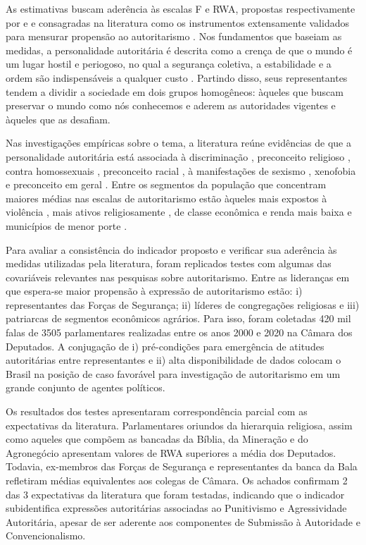 \documentclass[
12pt,				%
openright,			%
twoside,			%
a4paper,			%
english,			%
french,				%
spanish,			%
brazil				%
]{abntex2}
\begin{document}
As estimativas buscam aderência às escalas F e RWA, propostas respectivamente por  e  e consagradas na literatura como os instrumentos extensamente validados para mensurar propensão ao autoritarismo \cite{titus1957california, meloen1993f}. Nos fundamentos que baseiam as medidas, a personalidade autoritária é descrita como a crença de que o mundo é um lugar hostil e periogoso, no qual a segurança coletiva, a estabilidade e a ordem são indispensáveis a qualquer custo \cite{altemeyer1996authoritarian}. Partindo disso, seus representantes tendem a dividir a sociedade em dois grupos homogêneos: àqueles que buscam preservar o mundo como nós conhecemos e aderem as autoridades vigentes e àqueles que as desafiam.

Nas investigações empíricas sobre o tema, a literatura reúne evidências de que a personalidade autoritária está associada à discriminação \cite{titus1957california, meloen1993f}, preconceito religioso \cite{laythe2001predicting}, contra homossexuais \cite{hunsberger1996religious, jonathan2008influence}, preconceito racial \cite{rowatt2004christian}, à manifestações de sexismo \cite{sibley2007antecedents}, xenofobia \cite{thomsen2008we} e preconceito em geral \cite{asbrock2010right}. Entre os segmentos da população que concentram maiores médias nas escalas de autoritarismo estão àqueles mais expostos à violência \cite{seligson2010crime, carreras2013impact, de2018analises}, mais ativos religiosamente \cite{rokeach1956political,johnson2011mediational, fuks2012atitudes}, de classe econômica e renda mais baixa e municípios de menor porte \cite{fbsp2017medo}.      

Para avaliar a consistência do indicador proposto e verificar sua aderência às medidas utilizadas pela literatura, foram replicados testes com algumas das covariáveis relevantes nas pesquisas sobre autoritarismo. Entre as lideranças em que espera-se maior propensão à expressão de autoritarismo estão: i) representantes das Forças de Segurança; ii) líderes de congregações religiosas e iii) patriarcas de segmentos econômicos agrários. Para isso, foram coletadas 420 mil falas de 3505 parlamentares realizadas entre os anos 2000 e 2020 na Câmara dos Deputados. A conjugação de i) pré-condições para emergência de atitudes autoritárias entre representantes e ii) alta disponibilidade de dados colocam o Brasil na posição de caso favorável para investigação de autoritarismo em um grande conjunto de agentes políticos. 

Os resultados dos testes apresentaram correspondência parcial com as expectativas da literatura. Parlamentares oriundos da hierarquia religiosa, assim como aqueles que compõem as bancadas da Bíblia, da Mineração e do Agronegócio apresentam valores de RWA superiores a média dos Deputados. Todavia, ex-membros das Forças de Segurança e representantes da banca da Bala refletiram médias equivalentes aos colegas de Câmara. Os achados confirmam 2 das 3 expectativas da literatura que foram testadas, indicando que o indicador subidentifica expressões autoritárias associadas ao Punitivismo e Agressividade Autoritária, apesar de ser aderente aos componentes de Submissão à Autoridade e Convencionalismo. 
\end{document}
